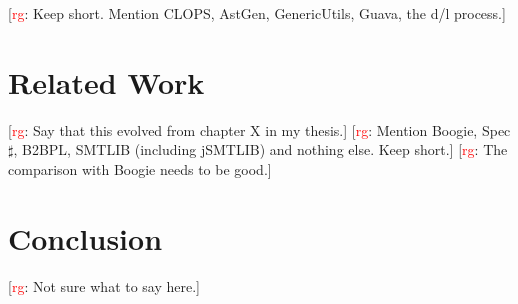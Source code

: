 \documentclass{llncs}
\newcommand{\rg}[1]{{\small [\textcolor{red}{rg}: #1]}}
\begin{document}
\rg{Keep short. Mention CLOPS, AstGen, GenericUtils, Guava, the d/l
process.}

\section{Related Work} %

\rg{Say that this evolved from chapter X in my thesis.}
\rg{Mention Boogie, Spec$\sharp$, B2BPL, SMTLIB (including jSMTLIB) and
nothing else. Keep short.}
\rg{The comparison with Boogie needs to be good.}

\section{Conclusion} %

\rg{Not sure what to say here.}



\end{document}
